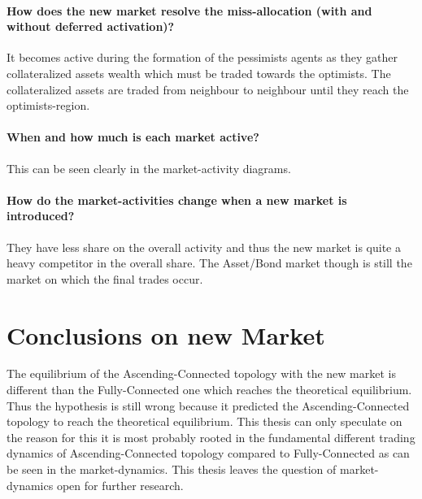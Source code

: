\documentclass[Bachelorarbeit.tex]{subfiles}
\begin{document}
\paragraph{How does the new market resolve the miss-allocation (with and without deferred activation)?}
It becomes active during the formation of the pessimists agents as they gather collateralized assets wealth which must be traded towards the optimists. The collateralized assets are traded from neighbour to neighbour until they reach the optimists-region.

\paragraph{When and how much is each market active?}
This can be seen clearly in the market-activity diagrams.

\paragraph{How do the market-activities change when a new market is introduced?}
They have less share on the overall activity and thus the new market is quite a heavy competitor in the overall share. The Asset/Bond market though is still the market on which the final trades occur.

\section{Conclusions on new Market}
The equilibrium of the Ascending-Connected topology with the new market is different than the Fully-Connected one which reaches the theoretical equilibrium. Thus the hypothesis is still wrong because it predicted the Ascending-Connected topology to reach the theoretical equilibrium. This thesis can only speculate on the reason for this it is most probably rooted in the fundamental different trading dynamics of Ascending-Connected topology compared to Fully-Connected as can be seen in the market-dynamics. This thesis leaves the question of market-dynamics open for further research.
\end{document}
